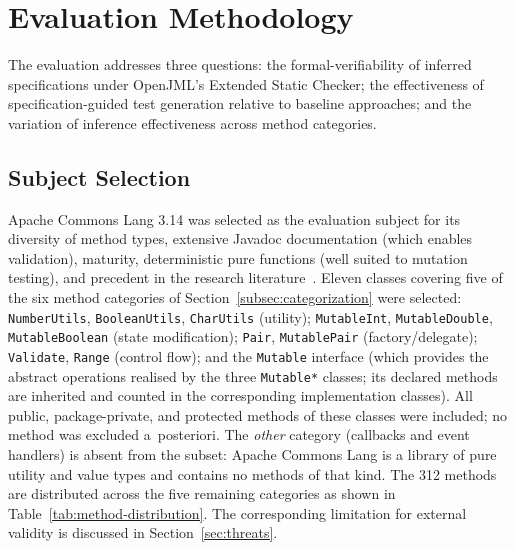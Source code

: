 \section{Evaluation Methodology}
\label{sec:methodology}

The evaluation addresses three questions: the formal-verifiability of inferred specifications under OpenJML's Extended Static Checker; the effectiveness of specification-guided test generation relative to baseline approaches; and the variation of inference effectiveness across method categories.

\subsection{Subject Selection}

Apache Commons Lang 3.14 was selected as the evaluation subject for its diversity of method types, extensive Javadoc documentation (which enables validation), maturity, deterministic pure functions (well suited to mutation testing), and precedent in the research literature~\cite{pacheco2007randoop, fraser2011evosuite}. Eleven classes covering five of the six method categories of Section~\ref{subsec:categorization} were selected: \texttt{NumberUtils}, \texttt{BooleanUtils}, \texttt{CharUtils} (utility); \texttt{MutableInt}, \texttt{MutableDouble}, \texttt{MutableBoolean} (state modification); \texttt{Pair}, \texttt{MutablePair} (factory/delegate); \texttt{Validate}, \texttt{Range} (control flow); and the \texttt{Mutable} interface (which provides the abstract operations realised by the three \texttt{Mutable*} classes; its declared methods are inherited and counted in the corresponding implementation classes). All public, package-private, and protected methods of these classes were included; no method was excluded a~posteriori. The \emph{other} category (callbacks and event handlers) is absent from the subset: Apache Commons Lang is a library of pure utility and value types and contains no methods of that kind. The 312 methods are distributed across the five remaining categories as shown in Table~\ref{tab:method-distribution}. The corresponding limitation for external validity is discussed in Section~\ref{sec:threats}.


